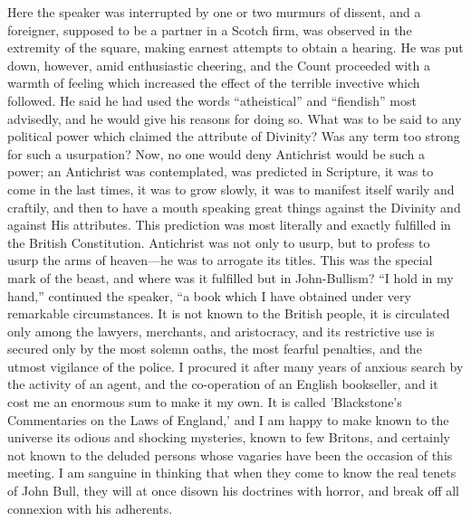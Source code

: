 Here the speaker was interrupted by one or two murmurs
of dissent, and a foreigner, supposed to be a partner in
a Scotch firm, was observed in the extremity of the
square, making earnest attempts to obtain a hearing. He
was put down, however, amid enthusiastic cheering, and
the Count proceeded with a warmth of feeling which
increased the effect of the terrible invective which
followed. He said he had used the words
``atheistical'' and ``fiendish'' most
advisedly, and he would give his reasons for doing so.
What was to be said to any political power which claimed
the attribute of Divinity? Was any term too strong for
such a usurpation? Now, no one would deny Antichrist
would be such a power; an Antichrist was contemplated,
was predicted in Scripture, it was to come in the last times, it was to grow slowly, it was to manifest itself
warily and craftily, and then to have a mouth speaking
great things against the Divinity and against His
attributes. This prediction was most literally and
exactly fulfilled in the British Constitution. Antichrist
was not only to usurp, but to profess to usurp the arms
of heaven—he was to arrogate its titles. This was
the special mark of the beast, and where was it fulfilled
but in John-Bullism? ``I hold in my hand,''
continued the speaker, ``a book which I have obtained
under very remarkable circumstances. It is not known to
the British people, it is circulated only among the
lawyers, merchants, and aristocracy, and its restrictive
use is secured only by the most solemn oaths, the most
fearful penalties, and the utmost vigilance of the
police. I procured it after many years of anxious search
by the activity of an agent, and the co-operation of an
English bookseller, and it cost me an enormous sum to
make it my own. It is called 'Blackstone's Commentaries
on the Laws of England,' and I am happy to make known to
the universe its odious and shocking mysteries, known to
few Britons, and certainly not known to the deluded
persons whose vagaries have been the occasion of this
meeting. I am sanguine in thinking that when they come to
know the real tenets of John Bull, they will at once
disown his doctrines with horror, and break off all
connexion with his adherents.

